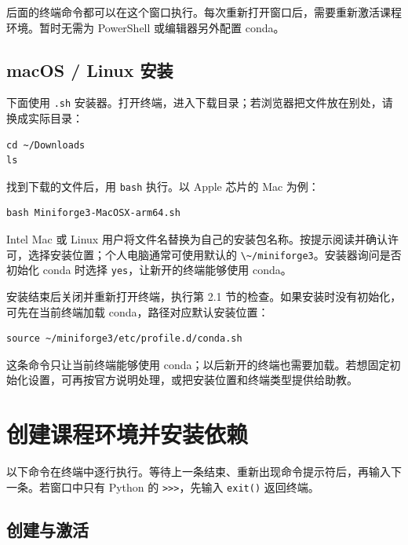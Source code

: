 \documentclass[UTF8,a4paper,11pt,fontset=fandol]{ctexart}
\providecommand{\passthrough}[1]{#1}
\begin{document}
后面的终端命令都可以在这个窗口执行。每次重新打开窗口后，需要重新激活课程环境。暂时无需为 PowerShell 或编辑器另外配置 conda。

\subsection{macOS / Linux 安装}\label{macos-linux-ux5b89ux88c5}

下面使用 \passthrough{\lstinline!.sh!} 安装器。打开终端，进入下载目录；若浏览器把文件放在别处，请换成实际目录：

\begin{lstlisting}[language={}]
cd ~/Downloads
ls
\end{lstlisting}

找到下载的文件后，用 \passthrough{\lstinline!bash!} 执行。以 Apple 芯片的 Mac 为例：

\begin{lstlisting}[language={}]
bash Miniforge3-MacOSX-arm64.sh
\end{lstlisting}

Intel Mac 或 Linux 用户将文件名替换为自己的安装包名称。按提示阅读并确认许可，选择安装位置；个人电脑通常可使用默认的 \passthrough{\lstinline!\~/miniforge3!}。安装器询问是否初始化 conda 时选择 \passthrough{\lstinline!yes!}，让新开的终端能够使用 conda。

安装结束后关闭并重新打开终端，执行第 2.1 节的检查。如果安装时没有初始化，可先在当前终端加载 conda，路径对应默认安装位置：

\begin{lstlisting}[language={}]
source ~/miniforge3/etc/profile.d/conda.sh
\end{lstlisting}

这条命令只让当前终端能够使用 conda；以后新开的终端也需要加载。若想固定初始化设置，可再按官方说明处理，或把安装位置和终端类型提供给助教。

\clearpage

\section{创建课程环境并安装依赖}\label{ux521bux5efaux8bfeux7a0bux73afux5883ux5e76ux5b89ux88c5ux4f9dux8d56}

以下命令在终端中逐行执行。等待上一条结束、重新出现命令提示符后，再输入下一条。若窗口中只有 Python 的 \passthrough{\lstinline!>>>!}，先输入 \passthrough{\lstinline!exit()!} 返回终端。

\subsection{创建与激活}\label{ux521bux5efaux4e0eux6fc0ux6d3b}
\end{document}
